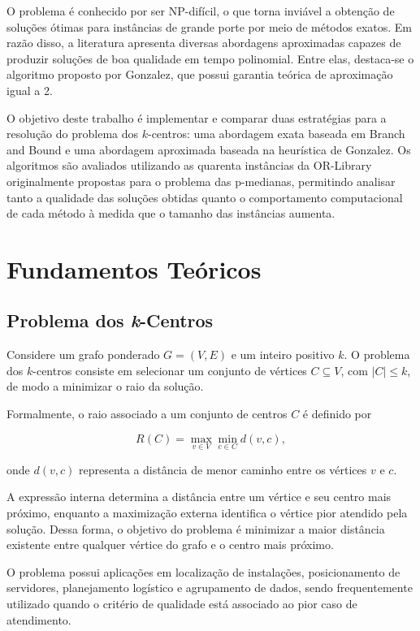 \documentclass[12pt]{article}
\begin{document}
O problema é conhecido por ser NP-difícil\cite{cormen2009,dasgupta2006}, o que torna inviável a obtenção de soluções ótimas para instâncias de grande porte por meio de métodos exatos. Em razão disso, a literatura apresenta diversas abordagens aproximadas capazes de produzir soluções de boa qualidade em tempo polinomial. Entre elas, destaca-se o algoritmo proposto por Gonzalez, que possui garantia teórica de aproximação igual a 2\cite{gonzalez1985,hochbaum1985}.

O objetivo deste trabalho é implementar e comparar duas estratégias para a resolução do problema dos $k$-centros: uma abordagem exata baseada em Branch and Bound e uma abordagem aproximada baseada na heurística de Gonzalez. Os algoritmos são avaliados utilizando as quarenta instâncias da OR-Library\cite{beasley1990} originalmente propostas para o problema das p-medianas, permitindo analisar tanto a qualidade das soluções obtidas quanto o comportamento computacional de cada método à medida que o tamanho das instâncias aumenta.

\section{Fundamentos Teóricos}

\subsection{Problema dos \textit{k}-Centros}

Considere um grafo ponderado $G=(V,E)$ e um inteiro positivo $k$. O problema dos $k$-centros consiste em selecionar um conjunto de vértices $C \subseteq V$, com $|C| \leq k$, de modo a minimizar o raio da solução.

Formalmente, o raio associado a um conjunto de centros $C$ é definido por

\[
R(C)=\max_{v \in V}\min_{c \in C} d(v,c),
\]

onde $d(v,c)$ representa a distância de menor caminho entre os vértices $v$ e $c$.

A expressão interna determina a distância entre um vértice e seu centro mais próximo, enquanto a maximização externa identifica o vértice pior atendido pela solução. Dessa forma, o objetivo do problema é minimizar a maior distância existente entre qualquer vértice do grafo e o centro mais próximo.

O problema possui aplicações em localização de instalações, posicionamento de servidores, planejamento logístico e agrupamento de dados, sendo frequentemente utilizado quando o critério de qualidade está associado ao pior caso de atendimento.
\end{document}
